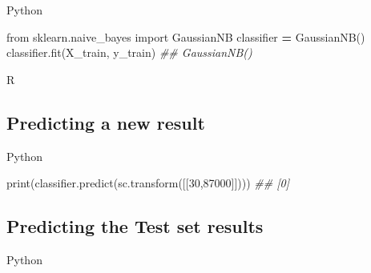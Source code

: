 \documentclass[
]{book}
\newenvironment{Shaded}{\begin{snugshade}}{\end{snugshade}}
\newcommand{\AttributeTok}[1]{\textcolor[rgb]{0.77,0.63,0.00}{#1}}
\newcommand{\BuiltInTok}[1]{#1}
\newcommand{\CommentTok}[1]{\textcolor[rgb]{0.56,0.35,0.01}{\textit{#1}}}
\newcommand{\DecValTok}[1]{\textcolor[rgb]{0.00,0.00,0.81}{#1}}
\newcommand{\FunctionTok}[1]{\textcolor[rgb]{0.00,0.00,0.00}{#1}}
\newcommand{\ImportTok}[1]{#1}
\newcommand{\NormalTok}[1]{#1}
\newcommand{\OperatorTok}[1]{\textcolor[rgb]{0.81,0.36,0.00}{\textbf{#1}}}
\newcommand{\OtherTok}[1]{\textcolor[rgb]{0.56,0.35,0.01}{#1}}
\newcommand{\SpecialCharTok}[1]{\textcolor[rgb]{0.00,0.00,0.00}{#1}}
\theoremstyle{definition}
\theoremstyle{definition}
\theoremstyle{definition}
\theoremstyle{definition}
\theoremstyle{remark}
\begin{document}
Python

\begin{Shaded}
\begin{Highlighting}[]
\ImportTok{from}\NormalTok{ sklearn.naive\_bayes }\ImportTok{import}\NormalTok{ GaussianNB}
\NormalTok{classifier }\OperatorTok{=}\NormalTok{ GaussianNB()}
\NormalTok{classifier.fit(X\_train, y\_train)}
\CommentTok{\#\# GaussianNB()}
\end{Highlighting}
\end{Shaded}

R

\begin{Shaded}
\end{Shaded}

\hypertarget{predicting-a-new-result-7}{%
\subsection{Predicting a new result}\label{predicting-a-new-result-7}}

Python

\begin{Shaded}
\begin{Highlighting}[]
\BuiltInTok{print}\NormalTok{(classifier.predict(sc.transform([[}\DecValTok{30}\NormalTok{,}\DecValTok{87000}\NormalTok{]])))}
\CommentTok{\#\# [0]}
\end{Highlighting}
\end{Shaded}

\hypertarget{predicting-the-test-set-results-6}{%
\subsection{Predicting the Test set results}\label{predicting-the-test-set-results-6}}

Python
\end{document}
